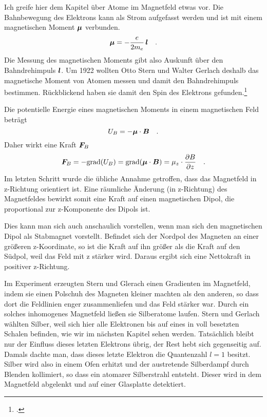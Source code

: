 Ich greife hier dem Kapitel über Atome im Magnetfeld etwas vor.
Die Bahnbewegung des Elektrons kann als Strom aufgefasst werden und ist mit einem magnetischen Moment $\boldsymbol{\mu}$ verbunden.
\begin{equation}
    \boldsymbol{\mu} = - \frac{e}{2 m_e} \,  \boldsymbol{l} \quad .
\end{equation}
Die Messung des magnetischen Moments gibt also Auskunft über den Bahndrehimpuls $\boldsymbol{l}$.
Um 1922 wollten Otto Stern und Walter Gerlach deshalb das magnetische Moment von Atomen messen und damit den Bahndrehimpuls bestimmen. Rückblickend haben sie damit den Spin des Elektrons gefunden.\footcite{SEP_Stern_gerlach}

Die potentielle Energie eines magnetischen Moments in einem magnetischen Feld beträgt
\begin{equation}
    U_B = - \boldsymbol{\mu} \cdot \boldsymbol{B} \quad .
\end{equation}
Daher wirkt eine Kraft $\boldsymbol{F}_B$
\begin{equation}
    \boldsymbol{F}_B = - \text{grad} ( U_B ) =  \text{grad} (\boldsymbol{\mu} \cdot \boldsymbol{B} ) = \mu_z \cdot \frac{\partial B}{\partial z} \quad .
\end{equation}
Im letzten Schritt wurde die übliche Annahme getroffen, dass das Magnetfeld in z-Richtung orientiert ist. Eine räumliche Änderung (in z-Richtung) des Magnetfeldes bewirkt somit eine Kraft auf einen magnetischen Dipol, die proportional zur z-Komponente des Dipols ist.

Dies kann man sich auch anschaulich vorstellen, wenn man sich den magnetischen Dipol als Stabmagnet vorstellt. Befindet sich der Nordpol des Magneten an einer größeren z-Koordinate, so ist die Kraft auf ihn größer als die Kraft auf den Südpol, weil das Feld mit z stärker wird. Daraus ergibt sich eine Nettokraft in positiver z-Richtung. 

Im Experiment erzeugten Stern und Glerach einen Gradienten im Magnetfeld, indem sie einen Polschuh des Magneten kleiner machten als den anderen, so dass dort die Feldlinien enger zusammenliefen und das Feld stärker war. Durch ein solches inhomogenes Magnetfeld ließen sie  Silberatome laufen. 
Stern und Gerlach wählten Silber, weil sich hier alle Elektronen bis auf eines in voll besetzten Schalen befinden, wie wir im nächsten Kapitel sehen werden. Tatsächlich bleibt nur der Einfluss dieses letzten Elektrons übrig, der Rest hebt sich gegenseitig auf. Damals dachte man, dass dieses letzte Elektron die Quantenzahl $l=1$ besitzt.
 Silber wird also in einem Ofen erhitzt und der austretende Silberdampf durch Blenden kollimiert, so dass ein atomarer Silberstrahl entsteht. Dieser wird in dem Magnetfeld abgelenkt und auf einer Glasplatte detektiert.


